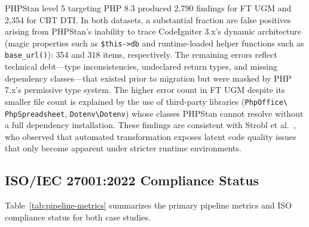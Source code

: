 \documentclass[conference]{IEEEtran}
\begin{document}
PHPStan level 5 targeting PHP 8.3 produced 2,790 findings for
FT UGM and 2,354 for CBT DTI. In both datasets, a substantial
fraction are false positives arising from PHPStan's inability to
trace CodeIgniter 3.x's dynamic architecture (magic properties
such as \texttt{\$this->db} and runtime-loaded helper functions
such as \texttt{base\_url()}): 354 and 318 items, respectively.
The remaining errors reflect technical debt---type
inconsistencies, undeclared return types, and missing dependency
classes---that existed prior to migration but were masked by PHP
7.x's permissive type system. The higher error count in FT UGM
despite its smaller file count is explained by the use of
third-party libraries (\texttt{PhpOffice\textbackslash
PhpSpreadsheet}, \texttt{Dotenv\textbackslash Dotenv}) whose
classes PHPStan cannot resolve without a full dependency
installation. These findings are consistent with Strobl et al.\
\cite{strobl2020automated}, who observed that automated
transformation exposes latent code quality issues that only
become apparent under stricter runtime environments.

\subsection{ISO/IEC 27001:2022 Compliance Status}

Table~\ref{tab:pipeline-metrics} summarizes the primary pipeline
metrics and ISO compliance status for both case studies.
\end{document}
